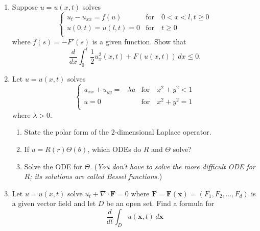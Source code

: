 \documentclass[12pt,letterpaper]{article}
\begin{document}
\begin{enumerate}
\begin{enumerate}
\begin{proof}
		\end{proof} 
		\item Prove that the cosine series converges uniformly in $[0,\pi]$. (\textit{Difficult!})
		\item Does the Fourier sine series of $f$ converges uniformly on $[0, \pi]$?
		\begin{proof}
			No,it does not converge. Suppose there exists a Fourier sine series that converge to $x$. Then the sine series must be of the form
			\[ f(x) = \sum_{n=1}^{\infty} A_n \sin n x\]
			Then we compute
			\[ f(\pi) = \sum_{n=1}^{\infty} A_n \sin n \pi = 0\]
			However, we have $f(\pi) = \pi$. Therefore the sine series does not converge to $x$ on $[0,\pi]$.
		\end{proof} 
	\end{enumerate}
	\item Suppose $u = u(x,t)$ solves
	\[ \left\{ \begin{array}{ll} 
		u_t - u_{xx} = f(u) & \mathrm{for} \quad 0 < x <l, t \geq 0 \\
		u(0,t) = u(l,t) = 0 &  \mathrm{for} \quad t \geq 0\\
	\end{array} \right. \]
	where $f(s) = -F'(s)$ is a given function. Show that
	\[ \frac{d}{dx} \int_0^l \frac 12 u_x^2 (x,t) + F(u(x,t)) \, dx \leq 0.\]
	\item Let $u = u(x,t)$ solves 
	\[ \left\{ \begin{array}{ll} 
		u_{xx} + u_{yy}  = -\lambda u & \mathrm{for} \quad x^2 + y^2 <1 \\
		u = 0 & \mathrm{for} \quad x^2 + y^2 = 1 \\
	\end{array} \right. \]
	where $\lambda > 0$.
	\begin{enumerate}
		\item State the polar form of the $2$-dimensional Laplace operator.
		\item If $u = R(r)\Theta(\theta)$, which ODEs do $R$ and $\Theta$ solve?
		\item Solve the ODE for $\Theta$. (\textit{You don't have to solve the more difficult ODE for $R$; its solutions are called Bessel functions.})
	\end{enumerate}
	\item Let $u = u(x,t)$ solve $u_t + \nabla \cdot \mathbf F = 0$ where $\mathbf F = \mathbf F(\mathbf x) = (F_{1}, F_2, \ldots, F_{d})$ is a given vector field and let $D$ be an open set. Find a formula for 
	\[ \frac{d}{dt} \int_D u(\mathbf x,t) \, d\mathbf x\]

\end{enumerate}
\end{document}
